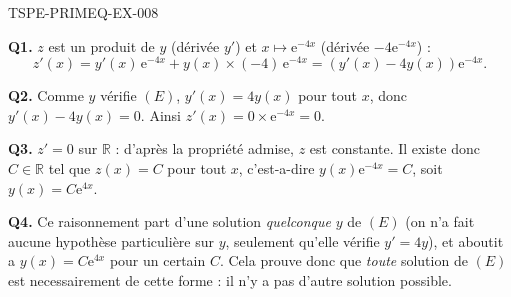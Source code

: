 \begin{corrige}{TSPE-PRIMEQ-EX-008}

\textbf{Q1.} $z$ est un produit de $y$ (dérivée $y'$) et $x \mapsto \mathrm{e}^{-4x}$ (dérivée $-4\mathrm{e}^{-4x}$) :
\[
  z'(x) = y'(x)\,\mathrm{e}^{-4x} + y(x)\times(-4)\,\mathrm{e}^{-4x} = \left(y'(x) - 4y(x)\right)\mathrm{e}^{-4x}.
\]

\textbf{Q2.} Comme $y$ vérifie $(E)$, $y'(x) = 4y(x)$ pour tout $x$, donc $y'(x)-4y(x)=0$. Ainsi $z'(x) = 0 \times \mathrm{e}^{-4x} = 0$.

\textbf{Q3.} $z' = 0$ sur $\mathbb{R}$ : d'après la propriété admise, $z$ est constante. Il existe donc $C \in \mathbb{R}$ tel que $z(x)=C$ pour tout $x$, c'est-a-dire $y(x)\mathrm{e}^{-4x}=C$, soit $y(x) = C\mathrm{e}^{4x}$.

\textbf{Q4.} Ce raisonnement part d'une solution \emph{quelconque} $y$ de $(E)$ (on n'a fait aucune hypothèse particulière sur $y$, seulement qu'elle vérifie $y'=4y$), et aboutit a $y(x)=C\mathrm{e}^{4x}$ pour un certain $C$. Cela prouve donc que \emph{toute} solution de $(E)$ est necessairement de cette forme : il n'y a pas d'autre solution possible.

\end{corrige}

%
%
%
%
%
